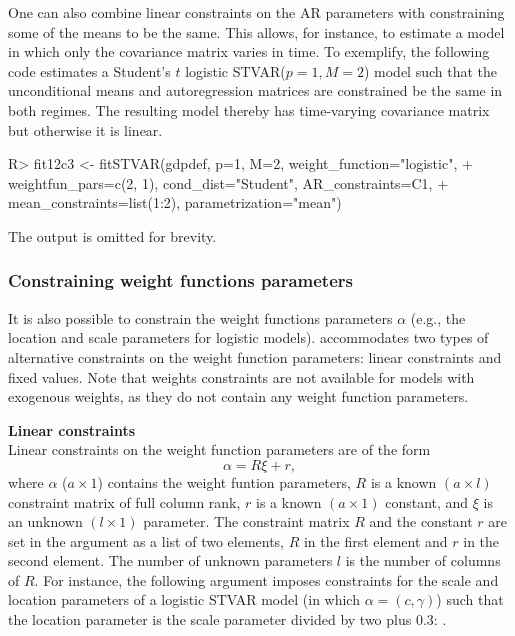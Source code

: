 \documentclass[nojss]{jss}
\begin{document}
One can also combine linear constraints on the AR parameters with constraining some of the means to be the same. This allows, for instance, to estimate a model in which only the covariance matrix varies in time. To exemplify, the following code estimates a Student's $t$ logistic STVAR($p=1, M=2$) model such that the unconditional means and autoregression matrices are constrained be the same in both regimes. The resulting model thereby has time-varying covariance matrix but otherwise it is linear.
%
\begin{CodeChunk}
\begin{CodeInput}
R> fit12c3 <- fitSTVAR(gdpdef, p=1, M=2, weight_function="logistic",
+    weightfun_pars=c(2, 1), cond_dist="Student", AR_constraints=C1,
+    mean_constraints=list(1:2), parametrization="mean")
\end{CodeInput}
\end{CodeChunk}
%
The output is omitted for brevity.

\subsubsection{Constraining weight functions parameters}
It is also possible to constrain the weight functions parameters $\alpha$ (e.g., the location and scale parameters for logistic models).  accommodates two types of alternative constraints on the weight function parameters: linear constraints and fixed values. Note that weights constraints are not available for models with exogenous weights, as they do not contain any weight function parameters.

\textbf{Linear constraints}\\
Linear constraints on the weight function parameters are of the form
\begin{equation}
\alpha = R\xi + r,
\end{equation}
where $\alpha$ ($a \times 1$) contains the weight funtion parameters, $R$ is a known $(a \times l)$ constraint matrix of full column rank, $r$ is a known $(a \times 1)$ constant, and $\xi$ is an unknown $(l \times 1)$ parameter. The constraint matrix $R$ and the constant $r$ are set in the argument  as a list of two elements, $R$ in the first element and $r$ in the second element. The number of unknown parameters $l$ is the number of columns of $R$. For instance, the following argument imposes constraints for the scale and location parameters of a logistic STVAR model (in which $\alpha = (c,\gamma)$) such that the location parameter is the scale parameter divided by two plus $0.3$: .
\end{document}
